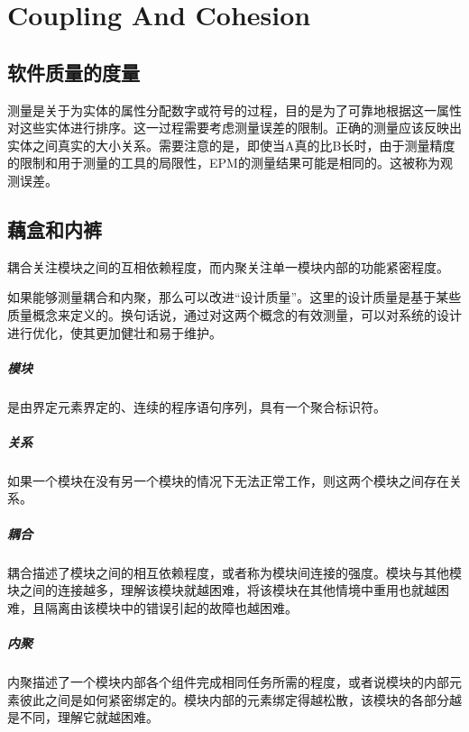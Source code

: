 \chapter{Coupling And Cohesion}

\section{软件质量的度量}

测量是关于为实体的属性分配数字或符号的过程，目的是为了可靠地根据这一属性对这些实体进行排序。这一过程需要考虑测量误差的限制。正确的测量应该反映出实体之间真实的大小关系。需要注意的是，即使当A真的比B长时，由于测量精度的限制和用于测量的工具的局限性，EPM的测量结果可能是相同的。这被称为观测误差。

\section{藕盒和内裤}

耦合关注模块之间的互相依赖程度，而内聚关注单一模块内部的功能紧密程度。

如果能够测量耦合和内聚，那么可以改进“设计质量”。这里的设计质量是基于某些质量概念来定义的。换句话说，通过对这两个概念的有效测量，可以对系统的设计进行优化，使其更加健壮和易于维护。

\paragraph{模块}是由界定元素界定的、连续的程序语句序列，具有一个聚合标识符。

\paragraph{关系}如果一个模块在没有另一个模块的情况下无法正常工作，则这两个模块之间存在关系。

\paragraph{耦合}耦合描述了模块之间的相互依赖程度，或者称为模块间连接的强度。模块与其他模块之间的连接越多，理解该模块就越困难，将该模块在其他情境中重用也就越困难，且隔离由该模块中的错误引起的故障也越困难。

\paragraph{内聚}内聚描述了一个模块内部各个组件完成相同任务所需的程度，或者说模块的内部元素彼此之间是如何紧密绑定的。模块内部的元素绑定得越松散，该模块的各部分越是不同，理解它就越困难。

